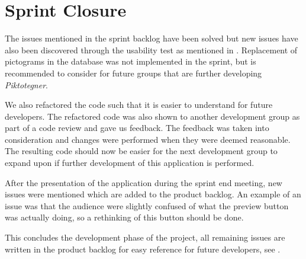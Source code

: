\section{Sprint Closure}
The issues mentioned in the sprint backlog have been solved but new issues have also been discovered through the usability test as mentioned in .
Replacement of pictograms in the database was not implemented in the sprint, but is recommended to consider for future groups that are further developing \textit{Piktotegner}.

We also refactored the code such that it is easier to understand for future developers.
The refactored code was also shown to another development group as part of a code review and gave us feedback.
The feedback was taken into consideration and changes were performed when they were deemed reasonable.
The resulting code should now be easier for the next development group to expand upon if further development of this application is performed.

After the presentation of the application during the sprint end meeting, new issues were mentioned which are added to the product backlog.
An example of an issue was that the audience were slightly confused of what the preview button was actually doing, so a rethinking of this button should be done.

This concludes the development phase of the project, all remaining issues are written in the product backlog for easy reference for future developers, see .